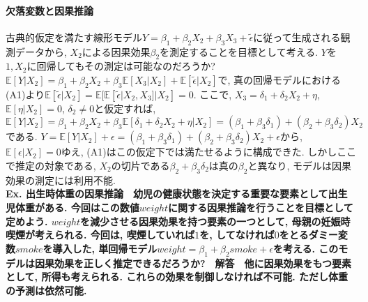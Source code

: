 \documentclass[paper=a4paper,fontsize=10pt]{jlreq}
\begin{document}
\paragraph{欠落変数と因果推論}
古典的仮定を満たす線形モデル$Y=\beta_1+\beta_2X_{2}+\beta_3X_{3}+\tilde{\epsilon}$に従って生成される観測データから, $X_2$による因果効果$\beta_2$を測定することを目標として考える. $Y$を$1, X_{2}$に回帰してもその測定は可能なのだろうか? $\mathbb{E}[Y|X_{2}]=\beta_1+\beta_2X_{2}+\beta_3\mathbb{E}[X_{3}|X_{2}]+\mathbb{E}[\tilde{\epsilon}|X_{2}]$で, 真の回帰モデルにおける(A1)より$\mathbb{E}[\tilde{\epsilon}|X_{2}]=\mathbb{E}[\mathbb{E}[\tilde{\epsilon}|X_{2}, X_{3}]|X_{2}]=0$. ここで, $X_3=\delta_1+\delta_2 X_{2} + \eta $, $\mathbb{E}[\eta|X_2]=0$, $\delta_2 \neq 0$と仮定すれば, $\mathbb{E}[Y|X_{2}]=\beta_1+\beta_2X_{2}+\beta_3\mathbb{E}[\delta_1+\delta_2 X_{2} + \eta|X_{2}]=(\beta_1+\beta_3\delta_1)+(\beta_2+\beta_3\delta_2)X_{2}$である. $Y=\mathbb{E}[Y|X_{2}]+\epsilon=(\beta_1+\beta_3\delta_1)+(\beta_2+\beta_3\delta_2)X_{2}+\epsilon$から, $\mathbb{E}[\epsilon|X_2]=0$ゆえ, (A1)はこの仮定下では満たせるように構成できた. しかしここで推定の対象である, $X_2$の切片である$\beta_2+\beta_3\delta_2$は真の$\beta_2$と異なり, モデルは因果効果の測定には利用不能.\\

\rmfamily\mcfamily\bfseries{Ex. 出生時体重の因果推論}\mdseries　幼児の健康状態を決定する重要な要素として出生児体重がある. 今回はこの数値$weight$に関する因果推論を行うことを目標として定めよう. $weight$を減少させる因果効果を持つ要素の一つとして, 母親の妊娠時喫煙が考えられる. 今回は, 喫煙していれば$1$を, してなければ$0$をとるダミー変数$smoke$を導入した, 単回帰モデル$weight = \beta_1 + \beta_2 smoke + \epsilon$を考える. このモデルは因果効果を正しく推定できるだろうか?　\rmfamily\mcfamily\bfseries{解答}\mdseries　他に因果効果をもつ要素として, 所得も考えられる. これらの効果を制御しなければ不可能. ただし体重の予測は依然可能.\\
\end{document}
